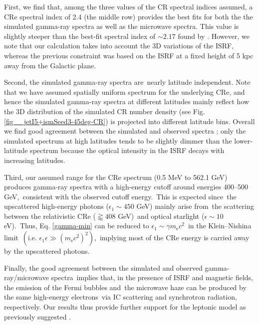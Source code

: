 \documentclass[fleqn,usenatbib,useAMS]{mnras}
\begin{document}
First, we find that, among the three values of the CR spectral indices assumed, a CRe spectral index of 2.4 (the middle row) provides the best fits for both the the simulated gamma-ray spectra as well as the microwave spectra. This value is slightly steeper than the best-fit spectral index of $\sim 2.17$ found by \cite{Ackermann2014}. However, we note that our calculation takes into account the 3D variations of the ISRF, whereas the previous constraint was based on the ISRF at a fixed height of 5 kpc away from the Galactic plane.

Second, the simulated gamma-ray spectra are\
nearly latitude independent. Note that we have assumed spatially uniform spectrum for the underlying CRe, and hence the simulated gamma-ray spectra at different latitudes mainly reflect how the 3D distribution of the simulated CR number density (see Fig. \ref{fig__jetI5+ismSeed3-45deg-CR})  is projected into different latitude bins. Overall we find good agreement between the simulated and observed spectra \citep{Ackermann2014}; only the simulated spectrum at high latitudes tends to be slightly dimmer than the lower-latitude spectrum because the optical intensity in the ISRF decays with increasing latitudes.

Third, our assumed range for the CRe spectrum (0.5 MeV to 562.1 GeV) produces gamma-ray spectra with a high-energy cutoff around energies 400--500 GeV,\
consistent with the observed cutoff energy.\
This is expected since\
the upscattered high-energy photons ($\epsilon_{1}\sim450$ GeV) mainly arise from\
the scattering between the relativistic CRe ($\gtrapprox 408$ GeV)\
and optical starlight ($\epsilon \sim 10$ eV).\
Thus, Eq. \ref{gamma-min} can be reduced to $\epsilon_{1}\sim\gamma m_{\text{e}}c^2$\
in the Klein--Nishina limit\
$\left(\text{i.e. }\epsilon_{1}\epsilon \gg \left(m_{\text{e}}c^2\right)^2\right)$,\
implying most of the CRe energy is carried away by the upscattered photons.

Finally, the good agreement between the simulated and observed gamma-ray/microwave spectra\
implies that, in the presence of ISRF and magnetic fields, the emission of the Fermi bubbles and\
the microwave haze can be produced by the same high-energy electrons\
via IC scattering and synchrotron radiation, respectively. Our results thus provide further support for the leptonic model as previously suggested \citep{Su2010, Ackermann2014, Yang2013, Yang2022}.
\end{document}
